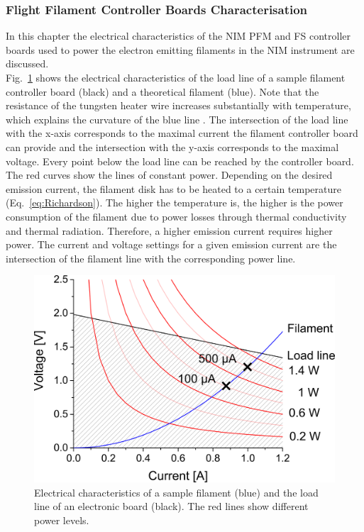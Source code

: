 		\subsubsection{Flight Filament Controller Boards Characterisation}
		In this chapter the electrical characteristics of the NIM PFM and FS controller boards used to power the electron emitting filaments in the NIM instrument are discussed.\\
		Fig.~\ref{fig:FilSampGraph} shows the electrical characteristics of the load line of a sample filament controller board (black) and a theoretical filament (blue). Note that the resistance of the tungsten heater wire increases substantially with temperature, which explains the curvature of the blue line \cite{Wilthan_2005}. The intersection of the load line with the x-axis corresponds to the maximal current the filament controller board can provide and the intersection with the y-axis corresponds to the maximal voltage. Every point below the load line can be reached by the controller board. The red curves show the lines of constant power. Depending on the desired emission current, the filament disk has to be heated to a certain temperature (Eq.~\eqref{eq:Richardson}). The higher the temperature is, the higher is the power consumption of the filament due to power losses through thermal conductivity and thermal radiation.	Therefore, a higher emission current requires higher power. The current and voltage settings for a given emission current are the intersection of the filament line with the corresponding power line.
		\begin{figure}[h!]
			\centering
			\includegraphics[width=.7\textwidth]{Bilder/Fil_SampGraph.png}
			\caption{Electrical characteristics of a sample filament (blue) and the load line of an electronic board (black). The red lines show different power levels.}
			\label{fig:FilSampGraph}
		\end{figure}
